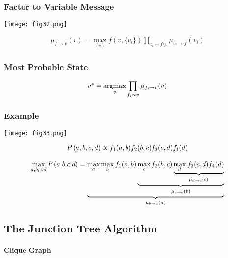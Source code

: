 \subsubsection*{Factor to Variable Message}

\begin{minipage}{0.4\textwidth}
	\centering
	\texttt{[image: fig32.png]}
\end{minipage}
\begin{minipage}{0.6\textwidth}
	\begin{align*}
	\mu_{f\to v}(v)=\max_{\{v_i\}}f(v,\{v_i\})\prod_{v_i\sim f\setminus v}\mu_{v_i\to f}(v_i)
	\end{align*}
\end{minipage}

\subsubsection*{Most Probable State}

\begin{align*}
	v^*=\argmax_v\prod_{f_i\sim v}\mu_{f_i\to v}(v)
\end{align*}

\subsubsection*{Example}

\begin{minipage}{0.4\textwidth}
	\centering
	\texttt{[image: fig33.png]}
\end{minipage}
\begin{minipage}{0.6\textwidth}
	\begin{align*}
	P\left(a,b,c,d\right)\varpropto f_1(a,b)f_2(b,c)f_3(c,d)f_4(d)
	\end{align*}
\end{minipage}

\begin{align*}
\max_{a,b,c,d}P\left(a.b.c.d\right)=\underbrace{\max_a\max_bf_1(a,b)\underbrace{\max_cf_2(b,c)\underbrace{\max_df_3(c,d)f_4(d)}_\text{$\mu_{d\to c}(c)$}}_\text{$\mu_{c\to b}(b)$}}_\text{$\mu_{b\to a}(a)$}
\end{align*}

\subsection{The Junction Tree Algorithm}

\paragraph{Clique Graph}


